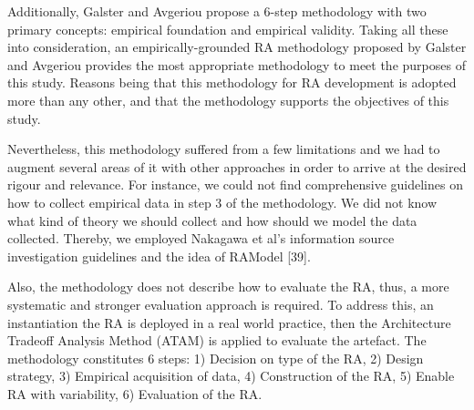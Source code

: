 \documentclass[conference]{IEEEtran}
\begin{document}

Additionally, Galster \cite{GALSTER} and Avgeriou \cite{Avgeriou} propose a 6-step methodology with two primary concepts: empirical foundation and empirical validity. Taking all these into consideration, an empirically-grounded RA methodology proposed by Galster and Avgeriou provides the most appropriate methodology to meet the purposes of this study. Reasons being that this methodology for RA development is adopted more than any other, and that the methodology supports the objectives of this study. 

Nevertheless, this methodology suffered from a few limitations and we had to augment several areas of it with
other approaches in order to arrive at the desired rigour and
relevance.  For instance, we could not find comprehensive
guidelines on how to collect empirical data in step 3 of
the methodology. We did not know what kind of theory we
should collect and how should we model the data collected.
Thereby, we employed Nakagawa et al’s information source
investigation guidelines and the idea of RAModel [39].

Also, the methodology does not describe how to evaluate the RA, thus, a more systematic and stronger evaluation approach is required. To address this, an instantiation the RA is deployed in a real world practice, then the Architecture Tradeoff Analysis Method (ATAM) \cite{KazmanATAM} is applied to evaluate the artefact. The methodology constitutes 6 steps: 1) Decision on type of the RA, 2) Design strategy, 3) Empirical acquisition of data, 4) Construction of the RA, 5) Enable RA with variability, 6) Evaluation of the RA. 
\end{document}
